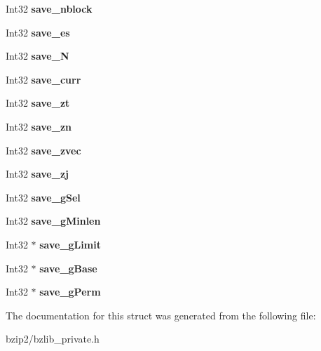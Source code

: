 \begin{DoxyCompactItemize}
\item 
Int32 {\bfseries save\+\_\+nblock}\hypertarget{struct_d_state_a5d7699aa94b2657f456c2536a6ef4a11}{}\label{struct_d_state_a5d7699aa94b2657f456c2536a6ef4a11}

\item 
Int32 {\bfseries save\+\_\+es}\hypertarget{struct_d_state_af315918dbf7bde5a609ab48e0a529252}{}\label{struct_d_state_af315918dbf7bde5a609ab48e0a529252}

\item 
Int32 {\bfseries save\+\_\+N}\hypertarget{struct_d_state_ab8d731eeb22ecee09c38b6ccb630ab4d}{}\label{struct_d_state_ab8d731eeb22ecee09c38b6ccb630ab4d}

\item 
Int32 {\bfseries save\+\_\+curr}\hypertarget{struct_d_state_ab384e39ec1db0f881d14104deac31101}{}\label{struct_d_state_ab384e39ec1db0f881d14104deac31101}

\item 
Int32 {\bfseries save\+\_\+zt}\hypertarget{struct_d_state_a4e6206a4729b75b272e852eb339fc386}{}\label{struct_d_state_a4e6206a4729b75b272e852eb339fc386}

\item 
Int32 {\bfseries save\+\_\+zn}\hypertarget{struct_d_state_a07d2e1ffc2870c0db120fe697a113cb1}{}\label{struct_d_state_a07d2e1ffc2870c0db120fe697a113cb1}

\item 
Int32 {\bfseries save\+\_\+zvec}\hypertarget{struct_d_state_a8d3ddbaa10235dc8958922a4e3ef30c8}{}\label{struct_d_state_a8d3ddbaa10235dc8958922a4e3ef30c8}

\item 
Int32 {\bfseries save\+\_\+zj}\hypertarget{struct_d_state_acc547664c9055ab2824d8200d97d80a6}{}\label{struct_d_state_acc547664c9055ab2824d8200d97d80a6}

\item 
Int32 {\bfseries save\+\_\+g\+Sel}\hypertarget{struct_d_state_ab11e52fdc10a8aca598c2e620b889f89}{}\label{struct_d_state_ab11e52fdc10a8aca598c2e620b889f89}

\item 
Int32 {\bfseries save\+\_\+g\+Minlen}\hypertarget{struct_d_state_a6561d422a828c7df1c6b5a5aaa2c7efa}{}\label{struct_d_state_a6561d422a828c7df1c6b5a5aaa2c7efa}

\item 
Int32 $\ast$ {\bfseries save\+\_\+g\+Limit}\hypertarget{struct_d_state_a5d0e068789a7f437cd36c773a5d65fd8}{}\label{struct_d_state_a5d0e068789a7f437cd36c773a5d65fd8}

\item 
Int32 $\ast$ {\bfseries save\+\_\+g\+Base}\hypertarget{struct_d_state_aea79e00a8605ea7d8f65e15824ad35b9}{}\label{struct_d_state_aea79e00a8605ea7d8f65e15824ad35b9}

\item 
Int32 $\ast$ {\bfseries save\+\_\+g\+Perm}\hypertarget{struct_d_state_a9c6bd9a53775182cea1bce61d020f3dc}{}\label{struct_d_state_a9c6bd9a53775182cea1bce61d020f3dc}

\end{DoxyCompactItemize}


The documentation for this struct was generated from the following file\+:\begin{DoxyCompactItemize}
\item 
bzip2/bzlib\+\_\+private.\+h\end{DoxyCompactItemize}
